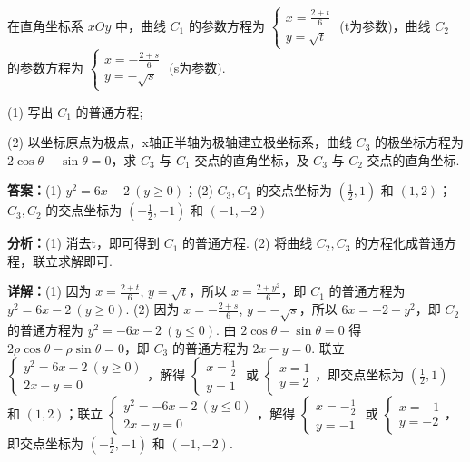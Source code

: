\begin{question}[points=10]
在直角坐标系 $xOy$ 中，曲线 $C_1$ 的参数方程为 $\begin{cases} x=\frac{2+t}{6} \\ y=\sqrt{t} \end{cases}$ (t为参数)，曲线 $C_2$ 的参数方程为 $\begin{cases} x=-\frac{2+s}{6} \\ y=-\sqrt{s} \end{cases}$ (s为参数).

(1) 写出 $C_1$ 的普通方程;

(2) 以坐标原点为极点，x轴正半轴为极轴建立极坐标系，曲线 $C_3$ 的极坐标方程为 $2\cos\theta-\sin\theta=0$，求 $C_3$ 与 $C_1$ 交点的直角坐标，及 $C_3$ 与 $C_2$ 交点的直角坐标.
\begin{solution}
\textbf{答案：}(1) $y^2=6x-2\ (y\geq0)$；(2) $C_3,C_1$ 的交点坐标为 $(\frac{1}{2},1)$ 和 $(1,2)$；$C_3,C_2$ 的交点坐标为 $(-\frac{1}{2},-1)$ 和 $(-1,-2)$

\textbf{分析：}(1) 消去t，即可得到 $C_1$ 的普通方程. (2) 将曲线 $C_2, C_3$ 的方程化成普通方程，联立求解即可.

\textbf{详解：}(1) 因为 $x=\frac{2+t}{6}$, $y=\sqrt{t}$，所以 $x=\frac{2+y^2}{6}$，即 $C_1$ 的普通方程为 $y^2=6x-2\ (y\geq0)$.
(2) 因为 $x=-\frac{2+s}{6}$, $y=-\sqrt{s}$，所以 $6x=-2-y^2$，即 $C_2$ 的普通方程为 $y^2=-6x-2\ (y\leq0)$. 由 $2\cos\theta-\sin\theta=0$ 得 $2\rho\cos\theta-\rho\sin\theta=0$，即 $C_3$ 的普通方程为 $2x-y=0$. 联立 $\begin{cases} y^2=6x-2\ (y\geq0) \\ 2x-y=0 \end{cases}$，解得 $\begin{cases} x=\frac{1}{2} \\ y=1 \end{cases}$ 或 $\begin{cases} x=1 \\ y=2 \end{cases}$，即交点坐标为 $(\frac{1}{2},1)$ 和 $(1,2)$；联立 $\begin{cases} y^2=-6x-2\ (y\leq0) \\ 2x-y=0 \end{cases}$，解得 $\begin{cases} x=-\frac{1}{2} \\ y=-1 \end{cases}$ 或 $\begin{cases} x=-1 \\ y=-2 \end{cases}$，即交点坐标为 $(-\frac{1}{2},-1)$ 和 $(-1,-2)$.
\end{solution}
\end{question}

